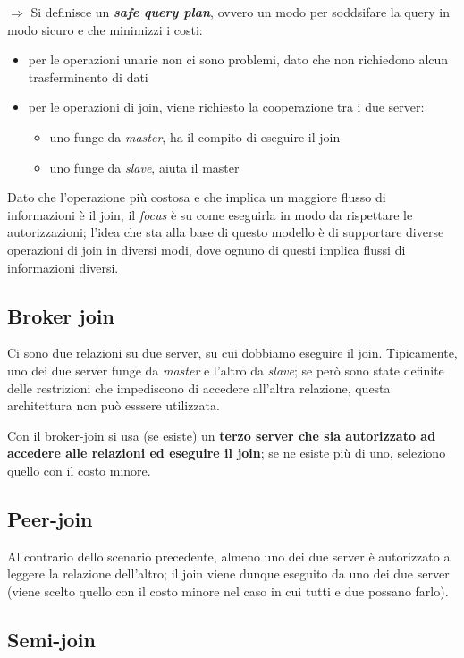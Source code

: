 \documentclass{report}
\begin{document}
\noindent $\Rightarrow$ Si definisce un \textit{\textbf{safe query plan}}, ovvero un modo per soddsifare la query in modo 
sicuro e che minimizzi i costi:
\begin{itemize}
    \item per le operazioni unarie non ci sono problemi, dato che non richiedono alcun trasferminento di dati 
    \item per le operazioni di join, viene richiesto la cooperazione tra i due server:
    \begin{itemize}
        \item uno funge da \textit{master}, ha il compito di eseguire il join 
        \item uno funge da \textit{slave}, aiuta il master
    \end{itemize}
\end{itemize}

\noindent Dato che l'operazione più costosa e che implica un maggiore flusso di informazioni 
è il join, il \textit{focus} è su come eseguirla in modo da rispettare le autorizzazioni; l'idea che 
sta alla base di questo modello è di supportare diverse operazioni di join in diversi modi, dove 
ognuno di questi implica flussi di informazioni diversi. 

\subsection{Broker join}
Ci sono due relazioni su due server, su cui dobbiamo eseguire il join. Tipicamente, uno 
dei due server funge da \textit{master} e l'altro da \textit{slave}; se però sono state definite delle restrizioni 
che impediscono di accedere all'altra relazione, questa architettura non può esssere utilizzata.

\noindent Con il broker-join si usa (se esiste) un \textbf{terzo server che sia autorizzato ad accedere alle relazioni 
ed eseguire il join}; se ne esiste più di uno, seleziono quello con il costo minore.

\subsection{Peer-join}
Al contrario dello scenario precedente, almeno uno dei due server è autorizzato a leggere 
la relazione dell'altro; il join viene dunque eseguito da uno dei due server (viene scelto quello 
con il costo minore nel caso in cui tutti e due possano farlo).


\subsection{Semi-join}
\end{document}
